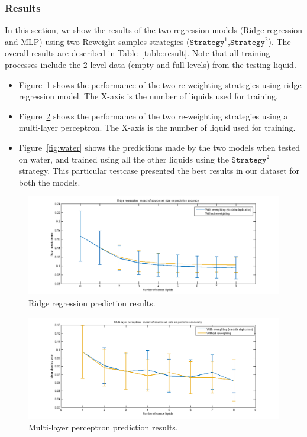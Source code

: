 \documentclass{article} %
\begin{document}
\subsubsection{Results}
In this section, we show the results of the two regression models (Ridge regression and MLP) using two Reweight samples strategies ($\mathtt{Strategy}^1$,$\mathtt{Strategy}^2$). The overall results are described in Table~\ref{table:result}. Note that all training processes include the 2 level data (empty and full levels) from the testing liquid.

\begin{itemize}
\item Figure~\ref{fig:ridge} shows the performance of the two re-weighting strategies using ridge regression model. The X-axis is the number of liquids used for training.

\item Figure~\ref{fig:nn} shows the performance of the two re-weighting strategies using a multi-layer perceptron. The X-axis is the number of liquid used for training.

\item Figure~\ref{fig:water} shows the predictions made by the two models when tested on water, and trained using all the other liquids using the $\mathtt{Strategy}^2$ strategy. This particular testcase presented the best results in our dataset for both the models.
\end{itemize}


\begin{figure}[htb]
\centering
\includegraphics[width=\linewidth]{source_set_size_ridge.png}
\caption{Ridge regression prediction results.}
\label{fig:ridge}
\end{figure}

\begin{figure}[htb]
\centering
\includegraphics[width=\linewidth]{source_set_size_nn.png}
\caption{Multi-layer perceptron prediction results.}
\label{fig:nn}
\end{figure}
\end{document}
